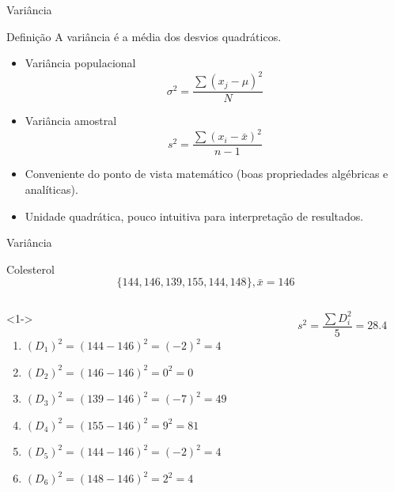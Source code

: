 \documentclass{beamer}
\begin{document}
\begin{frame}{\scriptsize Variância}
  \begin{block}{Definição}
    A variância é a média dos desvios quadráticos.
  \end{block}
  \begin{itemize}
    \footnotesize
  \item Variância populacional
$$\sigma^2 = \frac{\sum (x_j - \mu)^2}{N}$$
\item Variância amostral
$$s^2 = \frac{\sum (x_i - \bar{x})^2}{n-1}$$
\item Conveniente do ponto de vista matemático (boas propriedades
  algébricas e analíticas).
\item Unidade quadrática, pouco intuitiva para interpretação de
  resultados.
  \end{itemize}
\end{frame}

\begin{frame}{\scriptsize Variância}
  \begin{exampleblock}{Colesterol}
    \scriptsize
      \begin{displaymath}
    \{144, 146, 139, 155, 144, 148\}, \bar{x} = 146
  \end{displaymath}
    \bigskip
    \tiny
  \begin{columns}
    \begin{column}{6cm}<1->
      \begin{enumerate}
        \tiny
      \item $(D_1)^2 = (144-146)^2 = (-2)^2 = 4$
      \item $(D_2)^2 = (146-146)^2 = 0^2 = 0$
      \item $(D_3)^2 = (139-146)^2 = (-7)^2 = 49$
      \item $(D_4)^2 = (155-146)^2 = 9^2 = 81$
      \item $(D_5)^2 = (144-146)^2 = (-2)^2 = 4$
      \item $(D_6)^2 = (148-146)^2 = 2^2 = 4$
      \end{enumerate}
    \end{column}
    \begin{column}{4cm}
      \footnotesize
      \begin{displaymath}
        s^2 = \frac{\sum D_i^2}{5} = 28.4
      \end{displaymath}
    \end{column}
  \end{columns}
  \end{exampleblock}
\end{frame}
\end{document}

